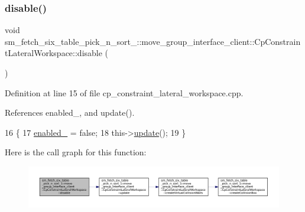 \subsubsection{\texorpdfstring{disable()}{disable()}}
{\footnotesize\ttfamily void sm\+\_\+fetch\+\_\+six\+\_\+table\+\_\+pick\+\_\+n\+\_\+sort\+\_\+::move\+\_\+group\+\_\+interface\+\_\+client\+::\+Cp\+Constraint\+Lateral\+Workspace\+::disable (\begin{DoxyParamCaption}{ }\end{DoxyParamCaption})}



Definition at line 15 of file cp\+\_\+constraint\+\_\+lateral\+\_\+workspace.\+cpp.



References enabled\+\_\+, and update().


\begin{DoxyCode}
16         \{
17             \hyperlink{classsm__fetch__six__table__pick__n__sort__1_1_1move__group__interface__client_1_1CpConstraintLateralWorkspace_a1ccb3b3c9fc3456aa3e4e95849ff7ded}{enabled\_} = \textcolor{keyword}{false};
18             this->\hyperlink{classsm__fetch__six__table__pick__n__sort__1_1_1move__group__interface__client_1_1CpConstraintLateralWorkspace_a90a9740b4c6810933cb9f72e49c03a55}{update}();
19         \}
\end{DoxyCode}
Here is the call graph for this function\+:
\nopagebreak
\begin{figure}[H]
\begin{center}
\leavevmode
\includegraphics[width=350pt]{classsm__fetch__six__table__pick__n__sort__1_1_1move__group__interface__client_1_1CpConstraintLateralWorkspace_a1a82a0d6e823971f194411d10b5fd6fb_cgraph}
\end{center}
\end{figure}
\mbox{\label{classsm__fetch__six__table__pick__n__sort__1_1_1move__group__interface__client_1_1CpConstraintLateralWorkspace_aabc96f25a0233ec8d1216d88fac2c0b7}} 
